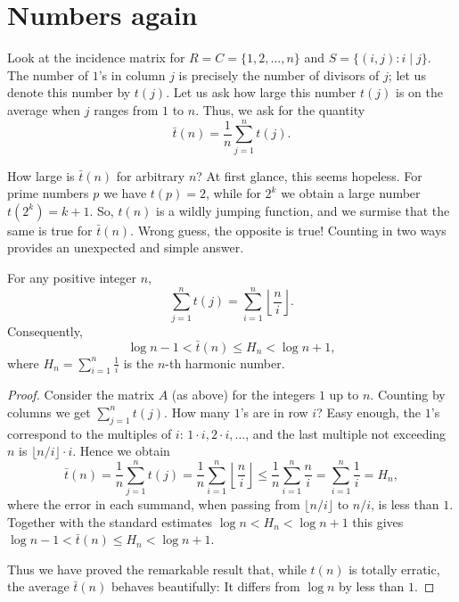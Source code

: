 \section{Numbers again}

Look at the incidence matrix for $R = C = \{1, 2, \dots, n\}$ and $S = \{(i,j) : i \mid j\}$.
The number of $1$'s in column $j$ is precisely the number of divisors of $j$; let us
denote this number by $t(j)$. Let us ask how large this number $t(j)$ is on the average
when $j$ ranges from $1$ to $n$. Thus, we ask for the quantity
\[
\bar{t}(n) = \frac{1}{n} \sum_{j=1}^{n} t(j).
\]

How large is $\bar{t}(n)$ for arbitrary $n$? At first glance, this seems hopeless. For
prime numbers $p$ we have $t(p) = 2$, while for $2^k$ we obtain a large number
$t(2^k) = k + 1$. So, $t(n)$ is a wildly jumping function, and we surmise that
the same is true for $\bar{t}(n)$. Wrong guess, the opposite is true! Counting in
two ways provides an unexpected and simple answer.

\begin{theorem}
  \label{ch28_avg_divisors}
  For any positive integer $n$,
  \[
  \sum_{j=1}^{n} t(j) = \sum_{i=1}^{n} \left\lfloor \frac{n}{i} \right\rfloor.
  \]
  Consequently,
  \[
  \log n - 1 < \bar{t}(n) \leq H_n < \log n + 1,
  \]
  where $H_n = \sum_{i=1}^{n} \frac{1}{i}$ is the $n$-th harmonic number.
\end{theorem}
\begin{proof}
  \leanok
  Consider the matrix $A$ (as above) for the integers $1$ up to $n$. Counting by
  columns we get $\sum_{j=1}^{n} t(j)$. How many $1$'s are in row $i$? Easy enough, the
  $1$'s correspond to the multiples of $i$: $1 \cdot i, 2 \cdot i, \dots$, and the last multiple not
  exceeding $n$ is $\lfloor n/i \rfloor \cdot i$. Hence we obtain
  \[
  \bar{t}(n) = \frac{1}{n} \sum_{j=1}^{n} t(j) = \frac{1}{n} \sum_{i=1}^{n} \left\lfloor \frac{n}{i} \right\rfloor
  \leq \frac{1}{n} \sum_{i=1}^{n} \frac{n}{i} = \sum_{i=1}^{n} \frac{1}{i} = H_n,
  \]
  where the error in each summand, when passing from $\lfloor n/i \rfloor$ to $n/i$, is less
  than $1$. Together with the standard estimates $\log n < H_n < \log n + 1$
  this gives $\log n - 1 < \bar{t}(n) \leq H_n < \log n + 1$.

  Thus we have proved the remarkable result that, while $t(n)$ is totally erratic,
  the average $\bar{t}(n)$ behaves beautifully: It differs from $\log n$ by less than $1$.
\end{proof}

